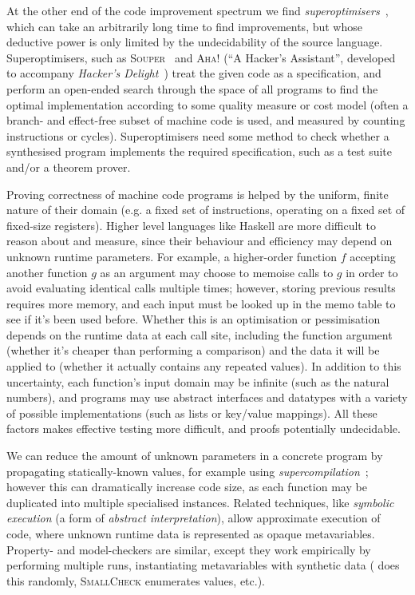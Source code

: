 At the other end of the code improvement spectrum we find
\emph{superoptimisers}~\cite{massalin1987superoptimizer}, which can take an
arbitrarily long time to find improvements, but whose deductive power is only
limited by the undecidability of the source language. Superoptimisers, such as
\textsc{Souper}~\cite{sasnauskas2017souper} and \textsc{Aha!} (``A Hacker's
Assistant'', developed to accompany \emph{Hacker's
  Delight}~\cite{warren2013hacker}) treat the given code as a specification, and
perform an open-ended search through the space of all programs to find the
optimal implementation according to some quality measure or cost model (often a
branch- and effect-free subset of machine code is used, and measured by counting
instructions or cycles).  Superoptimisers need some method to check whether a
synthesised program implements the required specification, such as a test suite
and/or a theorem prover.

Proving correctness of machine code programs is helped by the uniform, finite
nature of their domain (e.g. a fixed set of instructions, operating on a fixed
set of fixed-size registers). Higher level languages like Haskell are more
difficult to reason about and measure, since their behaviour and efficiency may
depend on unknown runtime parameters. For example, a higher-order function $f$
accepting another function $g$ as an argument may choose to memoise calls to $g$
in order to avoid evaluating identical calls multiple times; however, storing
previous results requires more memory, and each input must be looked up in the
memo table to see if it's been used before. Whether this is an optimisation or
pessimisation depends on the runtime data at each call site, including the
function argument (whether it's cheaper than performing a comparison) and the
data it will be applied to (whether it actually contains any repeated values).
In addition to this uncertainty, each function's input domain may be infinite
(such as the natural numbers), and programs may use abstract interfaces and
datatypes with a variety of possible implementations (such as lists or key/value
mappings). All these factors makes effective testing more difficult, and proofs
potentially undecidable.

We can reduce the amount of unknown parameters in a concrete program by
propagating statically-known values, for example using
\emph{supercompilation}~\cite{Turchin:1986:CS:5956.5957}; however this can
dramatically increase code size, as each function may be duplicated into
multiple specialised instances. Related techniques, like \emph{symbolic
  execution} (a form of \emph{abstract interpretation}), allow approximate
execution of code, where unknown runtime data is represented as opaque
metavariables. Property- and model-checkers are similar, except they work
empirically by performing multiple runs, instantiating metavariables with
synthetic data (\qcheck{} does this randomly, \textsc{SmallCheck} enumerates
values, etc.).

